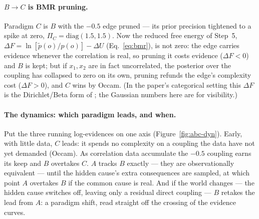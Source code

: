\paragraph{$B\to C$ is BMR pruning.} Paradigm $C$ is $B$ with the $-0.5$
edge pruned --- its prior precision tightened to a spike at zero,
$\Pi_C=\mathrm{diag}(1.5,1.5)$. Now the reduced free energy of Step~5,
$\Delta F=\ln[\tilde p(o)/p(o)]-\Delta U$ (Eq.~\ref{eq:bmr}), is not zero:
the edge carries evidence whenever the correlation is real, so pruning it
costs evidence ($\Delta F<0$) and $B$ is kept; but if $x_1,x_2$ are in
fact uncorrelated, the posterior over the coupling has collapsed to zero
on its own, pruning refunds the edge's complexity cost ($\Delta F>0$),
and $C$ wins by Occam. (In the paper's categorical setting this
$\Delta F$ is the Dirichlet/Beta form of \citet{Friston2018_2}; the
Gaussian numbers here are for visibility.)

\paragraph{The dynamics: which paradigm leads, and when.} Put the three
running log-evidences on one axis (Figure~\ref{fig:abc-dyn}). Early, with
little data, $C$ leads: it spends no complexity on a coupling the data
have not yet demanded (Occam). As correlation data accumulate the $-0.5$
coupling earns its keep and $B$ overtakes $C$. $A$ tracks $B$ exactly ---
they are observationally equivalent --- until the hidden cause's extra
consequences are sampled, at which point $A$ overtakes $B$ if the common
cause is real. And if the world changes --- the hidden cause switches
off, leaving only a residual direct coupling --- $B$ retakes the lead
from $A$: a paradigm shift, read straight off the crossing of the
evidence curves.


